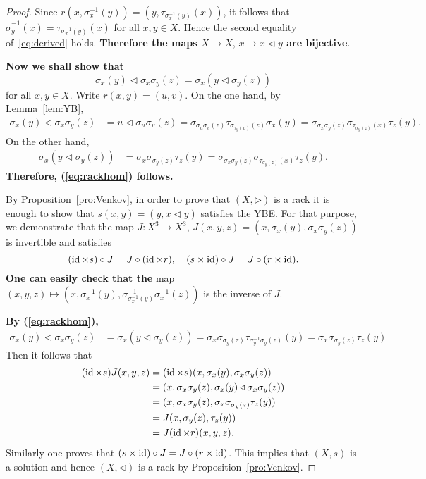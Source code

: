 \begin{proof}
    Since $r(x,\sigma_x^{-1}(y))=(y,\tau_{\sigma_x^{-1}(y)}(x))$, 
    it follows that 
    $\widehat{\sigma}_y^{-1}(x)=\tau_{\sigma_x^{-1}(y)}(x)$ 
    for all $x,y\in X$. Hence the second equality of~\eqref{eq:derived} holds. {\bf Therefore the maps $X\to X,\, x\mapsto x\triangleleft y$ are bijective}.
    
    {\bf Now we shall show that}
    \begin{equation}\label{eq:rackhom}
    \sigma_x(y)\triangleleft \sigma_x\sigma_y(z)=\sigma_x(y\triangleleft\sigma_y(z))
    \end{equation}
    for all $x,y\in X$. Write $r(x,y)=(u,v)$. On the one hand, by 
    Lemma~\ref{lem:YB}, 
    \begin{align*}
        \sigma_x(y)\triangleleft \sigma_x\sigma_y(z)
        &=u\triangleleft \sigma_u\sigma_v(z)
        =\sigma_{\sigma_u\sigma_v(z)}\tau_{\sigma_{\tau_y(x)}(z)}\sigma_x(y)
        =\sigma_{\sigma_x\sigma_y(z)}\sigma_{\tau_{\sigma_y(z)}(x)}\tau_z(y).
    \end{align*}
    On the other hand, 
    \begin{align*}
        \sigma_x(y\triangleleft\sigma_y(z)) 
        &=\sigma_x\sigma_{\sigma_y(z)}\tau_z(y)
        =\sigma_{\sigma_x\sigma_y(z)}\sigma_{\tau_{\sigma_y(z)}(x)}\tau_z(y).
    \end{align*}
{\bf Therefore, (\ref{eq:rackhom}) follows.}
    
    By Proposition~\ref{pro:Venkov}, in order to prove that $(X,\triangleright)$ is a rack it is enough to show that
    $s(x,y)=(y,x\triangleleft y)$ satisfies the YBE. For that purpose, we demonstrate that 
    the map $J\colon X^3\to X^3$, $J(x,y,z)=(x,\sigma_x(y),\sigma_x\sigma_y(z))$ 
    is invertible and 
    satisfies 
    \[
    (\operatorname{id}\times s)\circ J=J\circ(\operatorname{id}\times r),
    \quad
    (s\times\operatorname{id})\circ J=J\circ(r\times\operatorname{id}).
    \]
    {\bf One can easily check that the} map $(x,y,z)\mapsto (x,\sigma_x^{-1}(y),\sigma_{\sigma_x^{-1}(y)}^{-1}\sigma_x^{-1}(z))$ is the inverse of $J$. 

    {\bf By (\ref{eq:rackhom}),} 
    \begin{align*}
    \sigma_x(y)\triangleleft \sigma_x\sigma_y(z)
    &=\sigma_x(y\triangleleft \sigma_y(z))
    =\sigma_x\sigma_{\sigma_y(z)}\tau_{\sigma_y^{-1}\sigma_y(z)}(y)
    =\sigma_x\sigma_{\sigma_y(z)}\tau_z(y)
    \end{align*}
    Then it follows that 
    \begin{align*}
        (\operatorname{id}\times s)J(x,y,z)
        &=(\operatorname{id}\times s)(x,\sigma_x(y),\sigma_x\sigma_y(z))\\
        &=(x,\sigma_x\sigma_y(z),\sigma_x(y)\triangleleft \sigma_x\sigma_y(z))\\
        &=(x,\sigma_x\sigma_y(z),\sigma_x\sigma_{\sigma_y(z)}\tau_z(y))\\
        &=J(x,\sigma_y(z),\tau_z(y))\\
        &=J(\operatorname{id}\times r)(x,y,z).
    \end{align*}
    Similarly one proves that $(s\times\operatorname{id})\circ J=J\circ (r\times\operatorname{id})$.  
    This implies that $(X,s)$ is a solution and 
    hence $(X,\triangleleft)$ is a rack by Proposition~\ref{pro:Venkov}. 


\end{proof}
